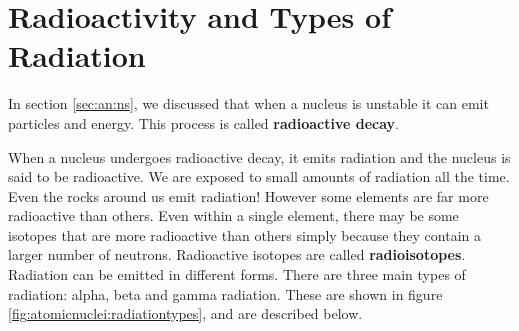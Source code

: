 



\section{Radioactivity and Types of Radiation}
\label{sec:an:r}

In section \ref{sec:an:ns}, we discussed that when a nucleus is unstable it can emit particles and energy. This process is called \textbf{radioactive decay}.


When a nucleus undergoes radioactive decay, it emits radiation and the nucleus is said to be radioactive. We are exposed to small amounts of radiation all the time. Even the rocks around us emit radiation! However some elements are far more radioactive than others. Even within a single element, there may be some isotopes that are more radioactive than others simply because they contain a larger number of neutrons. Radioactive isotopes are called \textbf{radioisotopes}.\\

Radiation can be emitted in different forms. There are three main types of radiation: alpha, beta and gamma
radiation. These are shown in figure \ref{fig:atomicnuclei:radiationtypes}, and are described below.\\

